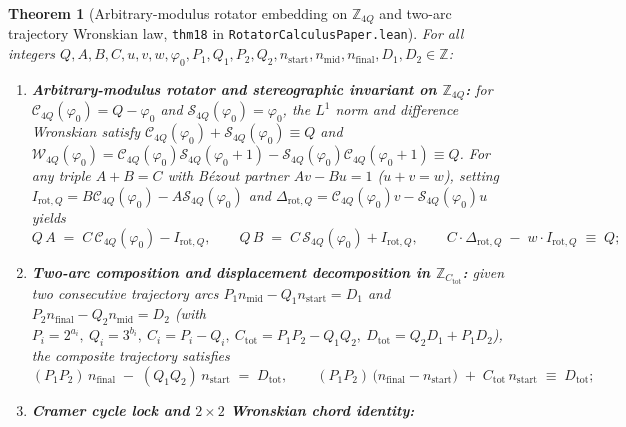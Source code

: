 \documentclass[11pt,a4paper]{article}
\newtheorem{theorem}{Theorem}[section]
\theoremstyle{definition}
\theoremstyle{remark}
\begin{document}
\begin{theorem}[Arbitrary-modulus rotator embedding on $\mathbb{Z}_{4Q}$ and two-arc trajectory Wronskian law, \texttt{thm18} in \texttt{RotatorCalculusPaper.lean}]
\label{thm:arbitrary-modulus-wronskian}
For all integers $Q, A, B, C, u, v, w, \varphi_0, P_1, Q_1, P_2, Q_2, n_{\mathrm{start}}, n_{\mathrm{mid}}, n_{\mathrm{final}}, D_1, D_2 \in \mathbb{Z}$:
\begin{enumerate}[label=\textbf{(\roman*)},leftmargin=*]
\item \textbf{Arbitrary-modulus rotator and stereographic invariant on $\mathbb{Z}_{4Q}$:}
  for $\mathcal{C}_{4Q}(\varphi_0) = Q - \varphi_0$ and $\mathcal{S}_{4Q}(\varphi_0) = \varphi_0$, the $L^1$ norm and difference Wronskian satisfy $\mathcal{C}_{4Q}(\varphi_0) + \mathcal{S}_{4Q}(\varphi_0) \equiv Q$ and $\mathcal{W}_{4Q}(\varphi_0) = \mathcal{C}_{4Q}(\varphi_0)\mathcal{S}_{4Q}(\varphi_0+1) - \mathcal{S}_{4Q}(\varphi_0)\mathcal{C}_{4Q}(\varphi_0+1) \equiv Q$. For any triple $A + B = C$ with Bézout partner $A v - B u = 1$ ($u + v = w$), setting $I_{\mathrm{rot},Q} = B\mathcal{C}_{4Q}(\varphi_0) - A\mathcal{S}_{4Q}(\varphi_0)$ and $\Delta_{\mathrm{rot},Q} = \mathcal{C}_{4Q}(\varphi_0)v - \mathcal{S}_{4Q}(\varphi_0)u$ yields
  \begin{equation}
    \label{eq:arbitrary-q-invariant}
    Q\,A \;=\; C\,\mathcal{C}_{4Q}(\varphi_0) - I_{\mathrm{rot},Q}, \qquad
    Q\,B \;=\; C\,\mathcal{S}_{4Q}(\varphi_0) + I_{\mathrm{rot},Q}, \qquad
    C\cdot\Delta_{\mathrm{rot},Q} \;-\; w\cdot I_{\mathrm{rot},Q} \;\equiv\; Q;
  \end{equation}
\item \textbf{Two-arc composition and displacement decomposition in $\mathbb{Z}_{C_{\mathrm{tot}}}$:}
  given two consecutive trajectory arcs $P_1 n_{\mathrm{mid}} - Q_1 n_{\mathrm{start}} = D_1$ and $P_2 n_{\mathrm{final}} - Q_2 n_{\mathrm{mid}} = D_2$ (with $P_i = 2^{a_i},\ Q_i = 3^{b_i},\ C_i = P_i - Q_i,\ C_{\mathrm{tot}} = P_1 P_2 - Q_1 Q_2,\ D_{\mathrm{tot}} = Q_2 D_1 + P_1 D_2$), the composite trajectory satisfies
  \begin{equation}
    \label{eq:composite-displacement}
    (P_1 P_2)\,n_{\mathrm{final}} \;-\; (Q_1 Q_2)\,n_{\mathrm{start}} \;=\; D_{\mathrm{tot}}, \qquad
    (P_1 P_2)\,\bigl(n_{\mathrm{final}} - n_{\mathrm{start}}\bigr) \;+\; C_{\mathrm{tot}}\,n_{\mathrm{start}} \;\equiv\; D_{\mathrm{tot}};
  \end{equation}
\item \textbf{Cramer cycle lock and $2\times 2$ Wronskian chord identity:}

\end{enumerate}
\end{theorem}
\end{document}
